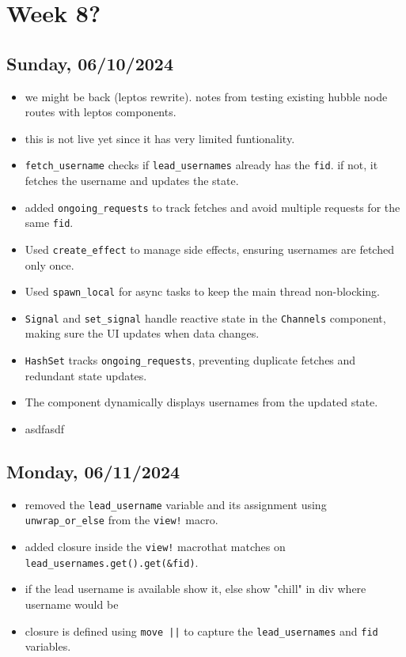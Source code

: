 \newpage
\section{Week 8?}
\subsection*{Sunday, 06/10/2024}
\begin{itemize}
    \item we might be back (leptos rewrite). notes from testing existing hubble
        node routes with leptos components.
    \item this is not live yet since it has very limited funtionality.
    \item \texttt{fetch_username} checks if \texttt{lead_usernames} already 
        has the \texttt{fid}. if not, it fetches the username and updates the 
        state.
    \item added \texttt{ongoing_requests} to track fetches and avoid multiple 
        requests for the same \texttt{fid}.
    \item Used \texttt{create_effect} to manage side effects, ensuring 
        usernames are fetched only once.
    \item Used \texttt{spawn_local} for async tasks to keep the main thread 
        non-blocking.
    \item \texttt{Signal} and \texttt{set_signal} handle reactive state in the 
        \texttt{Channels} component, making sure the UI updates when data 
        changes.
    \item \texttt{HashSet} tracks \texttt{ongoing_requests}, preventing 
        duplicate fetches and redundant state updates.
    \item The component dynamically displays usernames from the updated state.
    \item asdfasdf
\end{itemize}

\subsection*{Monday, 06/11/2024}
\begin{itemize}
    \item removed the \texttt{lead_username} variable and its assignment using 
        \texttt{unwrap_or_else} from the \texttt{view!} macro.
    \item added closure inside the \texttt{view!} macrothat matches on 
        \texttt{lead_usernames.get().get(&fid)}.
    \item if the lead username is available show it, else show "chill" in div
        where username would be 
    \item closure is defined using \texttt{move ||} to capture the 
        \texttt{lead_usernames} and \texttt{fid} variables.
\end{itemize}
